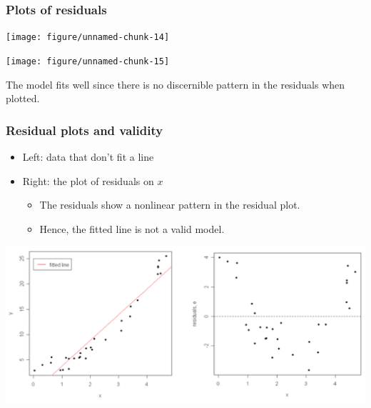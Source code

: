 \documentclass[handout]{beamer}\usepackage{graphicx, color}
\newenvironment{knitrout}{}{} %
\numberwithin{equation}{section}
\begin{document}
\begin{frame}[fragile]
\frametitle{\small Plots of residuals} \scriptsize
\begin{center}
\begin{knitrout}
\color{fgcolor}
\texttt{[image: figure/unnamed-chunk-14]} 

\end{knitrout}

\begin{knitrout}
\color{fgcolor}
\texttt{[image: figure/unnamed-chunk-15]} 

\end{knitrout}

\end{center}

The model fits well since there is no discernible pattern in the residuals when plotted.
\end{frame}

\begin{frame}
\frametitle{\small Residual plots and validity}
\begin{itemize}
\pause \item Left: data that don't fit a line
\pause \item Right: the plot of residuals on $x$
\begin{itemize}
\pause \item The residuals show a nonlinear pattern in the residual plot.
\pause \item Hence, the fitted line is not a valid model.
\end{itemize}
\end{itemize}
 \includegraphics{../../fig/residbad.png}
\end{frame}
\end{document}
